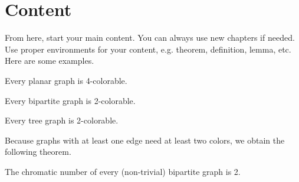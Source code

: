 \chapter{Content}

From here, start your main content. You can always use new chapters if needed.
Use proper environments for your content, e.g. theorem, definition, lemma, etc.
Here are some examples.


\begin{theorem}
	Every planar graph is 4-colorable.
\end{theorem}

\begin{lemma}
	Every bipartite graph is 2-colorable.
\end{lemma}
\begin{corollary}
	Every tree graph is 2-colorable.
\end{corollary}
Because graphs with at least one edge need at least two colors, we obtain the following theorem.

\begin{theorem}
	The chromatic number of every (non-trivial) bipartite graph is 2.
\end{theorem}
